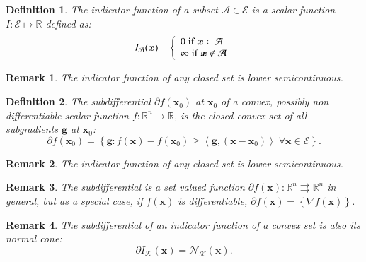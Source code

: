 \documentclass[final,3p]{elsarticle}
\newcommand{\vect}[1]{\bm{#1}}
\newtheorem{definition}{Definition}
\newtheorem*{remark*}{Remark}
\begin{document}
\begin{definition}
The \textit{indicator function} of a subset $\mathcal{A} \in \mathcal{E}$ is a scalar function $I: \mathcal{E} \mapsto \mathbb{R}$
defined as:
\begin{equation}
\label{eq:indicator}
{I}_{\mathcal{A}}(\vect{x}) = 
\left\{ 
\begin{array}[pos]{l}
0     \;  \text{if} \; \vect{x} \in \mathcal{A} \\
\infty   \; \text{if} \; \vect{x} \notin \mathcal{A}
\end{array}
\right.
\end{equation}
\end{definition}

\begin{remark*}
The indicator function of any closed set is lower semicontinuous.
\end{remark*}


\begin{definition}
The \textit{subdifferential} $\partial f(\vect{x}_0)$ at $\vect{x}_0$ of a convex, possibly non differentiable scalar function $f: \mathbb{R}^n \mapsto \mathbb{R}$, is the closed convex set of all subgradients $\vect{g}$ at $\vect{x}_0$:
\begin{equation}
\label{eq:subdifferential}
\partial f(\vect{x}_0) = \left\{ \vect{g} : 
  f(\vect{x}) -  f(\vect{x}_0) \geq \left\langle \vect{g}, (\vect{x} - \vect{x}_0) \right\rangle \; \forall \vect{x} \in \mathcal{E} \right\}.
\end{equation}
\end{definition}

\begin{remark*}
The indicator function of any closed set is lower semicontinuous.
\end{remark*}

\begin{remark*}
The subdifferential is a set valued function $\partial f(\vect{x}): \mathbb{R}^n \rightrightarrows \mathbb{R}^n$ in general, but as a special case, if $f(\vect{x})$ is differentiable, $\partial f(\vect{x}) = \left\{ \nabla f(\vect{x}) \right\}$.
\end{remark*}

\begin{remark*}
The subdifferential of an indicator function of a convex set is also its normal cone:
%
\begin{equation}
\label{eq:sub_ind}
\partial {I}_{\mathcal{K}}(\vect{x}) = \mathcal{N}_{\mathcal{K}}(\vect{x}).
\end{equation}
\end{remark*}
\end{document}
